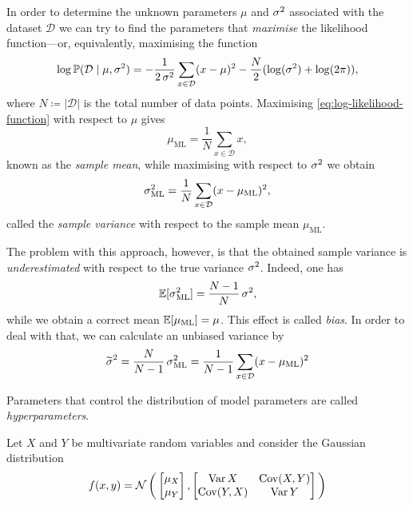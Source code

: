 \begin{remark}
    \label{rem:find-mean-and-variance-with-maximum-likelihood}
    In order to determine the unknown parameters \(\mu\) and \(\operatorname{\sigma}^2\) associated
    with the dataset \(\mathcal{D}\) we can try to find the parameters that
    \emph{maximise} the likelihood function---or, equivalently, maximising the
    function
    \begin{equation}\label{eq:log-likelihood-function}
        \log \operatorname{\mathbb{P}}(\mathcal{D} \mid \mu, \operatorname{\sigma}^2)
        = - \frac{1}{2 \operatorname{\sigma}^{2}}
        \sum_{x \in \mathcal{D}} (x - \mu)^2 - \frac{N}{2}(\log(\operatorname{\sigma}^2) + \log(2 \pi)),
    \end{equation}
    where \(N \coloneq |\mathcal{D}|\) is the total number of data points.
    Maximising \cref{eq:log-likelihood-function} with respect to \(\mu\) gives
    \[
        \mu_{\text{ML}} = \frac{1}{N} \sum_{x \in \mathcal{D}} x,
    \]
    known as the \emph{sample mean}, while maximising with respect to \(\operatorname{\sigma}^2\)
    we obtain
    \[
        \operatorname{\sigma}^2_{\text{ML}} = \frac{1}{N} \sum_{x \in \mathcal{D}} (x - \mu_{\text{ML}})^2,
    \]
    called the \emph{sample variance} with respect to the sample mean
    \(\mu_{\text{ML}}\).

    The problem with this approach, however, is that the obtained sample variance is
    \emph{underestimated} with respect to the true variance \(\operatorname{\sigma}^2\). Indeed,
    one has
    \[
        \operatorname{\mathbb{E}}[\operatorname{\sigma}^2_{\text{ML}}] = \frac{N-1}{N} \operatorname{\sigma}^2,
    \]
    while we obtain a correct mean \(\operatorname{\mathbb{E}}[\mu_{\text{ML}}] = \mu\). This effect
    is called \emph{bias}. In order to deal with that, we can calculate an unbiased
    variance by
    \[
        \widetilde{\operatorname{\sigma}}^2 = \frac{N}{N-1} \operatorname{\sigma}^2_{\text{ML}}
        = \frac{1}{N-1} \sum_{x \in \mathcal{D}} (x - \mu_{\text{ML}})^2
    \]
\end{remark}

\begin{definition}[Hyperparameters]
    \label{def:hyperparameters}
    Parameters that control the distribution of model parameters are called
    \emph{hyperparameters}.
\end{definition}

Let \(X\) and \(Y\) be multivariate random variables and consider the
Gaussian distribution
\[
    f(x, y) = \operatorname{\mathcal{N}}\bigg(
    \begin{bmatrix}
            \mu_X \\
            \mu_Y
        \end{bmatrix},
    \begin{bmatrix}
            \operatorname{Var} X     & \operatorname{Cov}(X, Y) \\
            \operatorname{Cov}(Y, X) & \operatorname{Var} Y
        \end{bmatrix}
    \bigg)
\]

